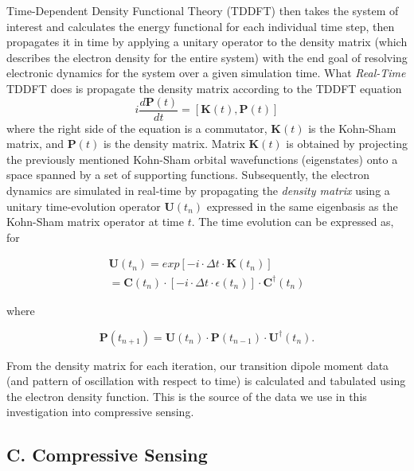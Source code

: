 \documentclass[11pt]{article}
\begin{document}
\par Time-Dependent Density Functional Theory (TDDFT) then takes the system of interest and calculates the energy functional for each individual time step, then propagates it in time by applying a unitary operator to the density matrix (which describes the electron density for the entire system) with the end goal of resolving electronic dynamics for the system over a given simulation time.  What \emph{Real-Time} TDDFT does is propagate the density matrix according to the TDDFT equation
\begin{equation}\label{eq:tddft}
	i\frac{d\mathbf{P}(t)}{dt} = [\mathbf{K}(t), \mathbf{P}(t)]
\end{equation}
where the right side of the equation is a commutator, $\mathbf{K}(t)$ is the Kohn-Sham matrix, and $\mathbf{P}(t)$ is the density matrix.  Matrix $\mathbf{K}(t)$ is obtained by projecting the previously mentioned Kohn-Sham orbital wavefunctions (eigenstates) onto a space spanned by a set of supporting functions. Subsequently, the electron dynamics are simulated in real-time by propagating the \emph{density matrix} using a unitary time-evolution operator $\mathbf{U}(t_{n})$ expressed in the same eigenbasis as the Kohn-Sham matrix operator at time $t$.  The time evolution can be expressed as, for 

\begin{equation}\label{eq:prop}
\begin{split}
	\mathbf{U}(t_{n}) = exp[-i \cdot\Delta t \cdot \mathbf{K}(t_{n})]\\
	=\mathbf{C}(t_{n})\cdot[-i\cdot\Delta t \cdot \epsilon (t_{n})]\cdot \mathbf{C}^{\dag}(t_{n})
\end{split}
\end{equation}

where

\begin{equation}\label{eq:evol}
	\mathbf{P}(t_{n+1}) = \mathbf{U}(t_{n})\cdot\mathbf{P}(t_{n-1})\cdot\mathbf{U}^{\dag}(t_{n}).
\end{equation}

\par From the density matrix for each iteration, our transition dipole moment data (and pattern of oscillation with respect to time) is calculated and tabulated using the electron density function.  This is the source of the data we use in this investigation into compressive sensing.

\subsection*{C.	Compressive Sensing}	%
\end{document}
